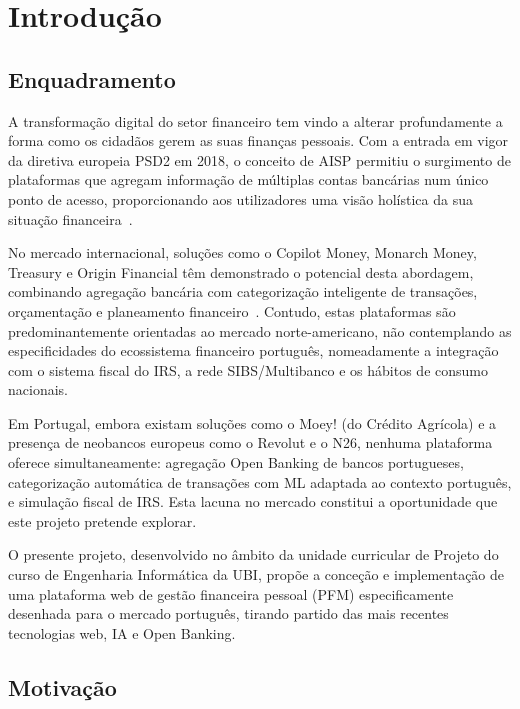 \chapter{Introdução}
\label{chap:intro}

\section{Enquadramento}
\label{sec:enquadramento}

A transformação digital do setor financeiro tem vindo a alterar profundamente a forma como os cidadãos gerem as suas finanças pessoais. Com a entrada em vigor da diretiva europeia \ac{PSD2} em 2018, o conceito de \ac{AISP} permitiu o surgimento de plataformas que agregam informação de múltiplas contas bancárias num único ponto de acesso, proporcionando aos utilizadores uma visão holística da sua situação financeira~\cite{psd2directive}.

No mercado internacional, soluções como o Copilot Money, Monarch Money, Treasury e Origin Financial têm demonstrado o potencial desta abordagem, combinando agregação bancária com categorização inteligente de transações, orçamentação e planeamento financeiro~\cite{copilot2024,monarch2024}. Contudo, estas plataformas são predominantemente orientadas ao mercado norte-americano, não contemplando as especificidades do ecossistema financeiro português, nomeadamente a integração com o sistema fiscal do \ac{IRS}, a rede \ac{SIBS}/Multibanco e os hábitos de consumo nacionais.

Em Portugal, embora existam soluções como o Moey! (do Crédito Agrícola) e a presença de neobancos europeus como o Revolut e o N26, nenhuma plataforma oferece simultaneamente: agregação Open Banking de bancos portugueses, categorização automática de transações com \ac{ML} adaptada ao contexto português, e simulação fiscal de \ac{IRS}. Esta lacuna no mercado constitui a oportunidade que este projeto pretende explorar.

O presente projeto, desenvolvido no âmbito da unidade curricular de Projeto do curso de Engenharia Informática da \ac{UBI}, propõe a conceção e implementação de uma plataforma web de gestão financeira pessoal (\ac{PFM}) especificamente desenhada para o mercado português, tirando partido das mais recentes tecnologias web, \ac{IA} e Open Banking.


\section{Motivação}
\label{sec:motivacao}

